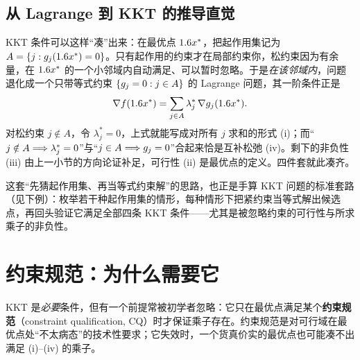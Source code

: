 
\subsection{从 Lagrange 到 KKT 的推导直觉}
\label{sec:kkt-derive}

KKT 条件可以这样``凑''出来：在最优点 $1.6 x^*$，把起作用集记为 $A=\left\{j:g_j(1.6 x^*)=0\right\}$。只有起作用的约束才在局部约束你，松约束因为有余量，在 $1.6 x^*$ 的一个小邻域内自动满足、可以暂时忽略。于是\emph{在该邻域内}，问题退化成一个只带等式约束 $\left\{g_j=0:j\in A\right\}$ 的 Lagrange 问题，其一阶条件正是
\[
    \nabla f(1.6 x^*)=\sum_{j\in A}\lambda_j^*\,\nabla g_j(1.6 x^*) .
\]
对松约束 $j\notin A$，令 $\lambda_j^*=0$，上式就能写成对所有 $j$ 求和的形式 (i)；而``$j\notin A\Longrightarrow\lambda_j^*=0$''与``$j\in A\Longrightarrow g_j=0$''合起来恰是互补松弛 (iv)。剩下的非负性 (iii) 由上一小节的方向论证补足，可行性 (ii) 是最优点的定义。四件套就此凑齐。

这套``先猜起作用集、再当等式约束解''的思路，也正是手算 KKT 问题的标准套路（见下例）：枚举若干种起作用集的情形，每种情形下把紧约束当等式解出候选点，再回头验证它满足全部四条 KKT 条件——尤其是被忽略约束的可行性与所求乘子的非负性。


\section{约束规范：为什么需要它}
\label{sec:kkt-cq}

KKT 是\emph{必要}条件，但有一个前提常被初学者忽略：它只在最优点满足某个\textbf{约束规范}（constraint qualification, CQ）时才保证乘子存在。约束规范是对可行域在最优点处``不太病态''的技术性要求；它失效时，一个货真价实的最优点也可能凑不出满足 (i)--(iv) 的乘子。

